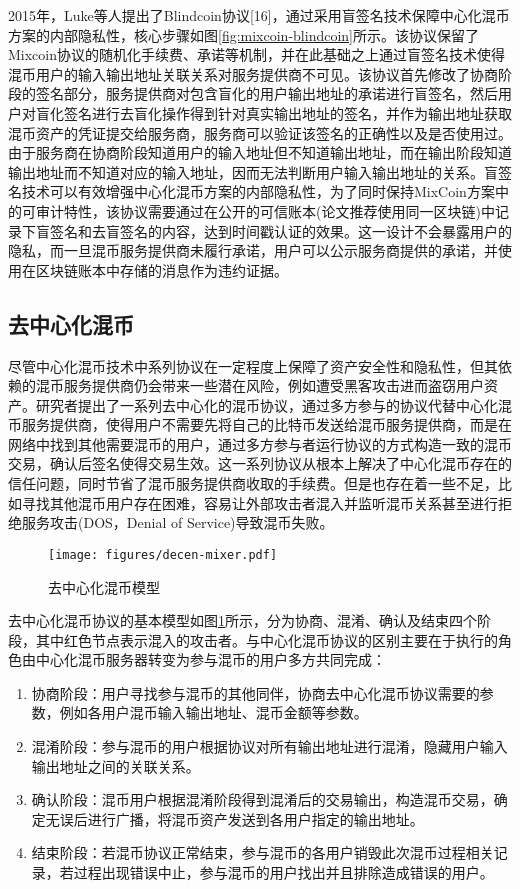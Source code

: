 2015年，Luke等人提出了Blindcoin协议[16]，通过采用盲签名技术保障中心化混币方案的内部隐私性，核心步骤如图\ref{fig:mixcoin-blindcoin}所示。该协议保留了Mixcoin协议的随机化手续费、承诺等机制，并在此基础之上通过盲签名技术使得混币用户的输入输出地址关联关系对服务提供商不可见。该协议首先修改了协商阶段的签名部分，服务提供商对包含盲化的用户输出地址的承诺进行盲签名，然后用户对盲化签名进行去盲化操作得到针对真实输出地址的签名，并作为输出地址获取混币资产的凭证提交给服务商，服务商可以验证该签名的正确性以及是否使用过。由于服务商在协商阶段知道用户的输入地址但不知道输出地址，而在输出阶段知道输出地址而不知道对应的输入地址，因而无法判断用户输入输出地址的关系。盲签名技术可以有效增强中心化混币方案的内部隐私性，为了同时保持MixCoin方案中的可审计特性，该协议需要通过在公开的可信账本(论文推荐使用同一区块链)中记录下盲签名和去盲签名的内容，达到时间戳认证的效果。这一设计不会暴露用户的隐私，而一旦混币服务提供商未履行承诺，用户可以公示服务商提供的承诺，并使用在区块链账本中存储的消息作为违约证据。

\subsection{去中心化混币}

尽管中心化混币技术中系列协议在一定程度上保障了资产安全性和隐私性，但其依赖的混币服务提供商仍会带来一些潜在风险，例如遭受黑客攻击进而盗窃用户资产。研究者提出了一系列去中心化的混币协议，通过多方参与的协议代替中心化混币服务提供商，使得用户不需要先将自己的比特币发送给混币服务提供商，而是在网络中找到其他需要混币的用户，通过多方参与者运行协议的方式构造一致的混币交易，确认后签名使得交易生效。这一系列协议从根本上解决了中心化混币存在的信任问题，同时节省了混币服务提供商收取的手续费。但是也存在着一些不足，比如寻找其他混币用户存在困难，容易让外部攻击者混入并监听混币关系甚至进行拒绝服务攻击(DOS，Denial of Service)导致混币失败。
 
\begin{figure}
\centering
\texttt{[image: figures/decen-mixer.pdf]}
\caption{去中心化混币模型}
\label{fig:decen-mixer}
\end{figure}

去中心化混币协议的基本模型如图\ref{fig:decen-mixer}所示，分为协商、混淆、确认及结束四个阶段，其中红色节点表示混入的攻击者。与中心化混币协议的区别主要在于执行的角色由中心化混币服务器转变为参与混币的用户多方共同完成：

\begin{enumerate}
	\item 协商阶段：用户寻找参与混币的其他同伴，协商去中心化混币协议需要的参数，例如各用户混币输入输出地址、混币金额等参数。
	\item 混淆阶段：参与混币的用户根据协议对所有输出地址进行混淆，隐藏用户输入输出地址之间的关联关系。
	\item 确认阶段：混币用户根据混淆阶段得到混淆后的交易输出，构造混币交易，确定无误后进行广播，将混币资产发送到各用户指定的输出地址。
	\item 结束阶段：若混币协议正常结束，参与混币的各用户销毁此次混币过程相关记录，若过程出现错误中止，参与混币的用户找出并且排除造成错误的用户。
\end{enumerate}

